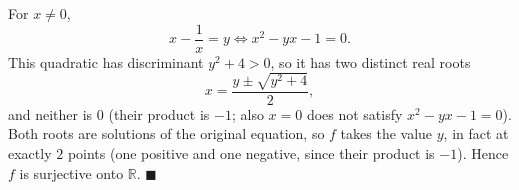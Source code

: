 For $x\ne0$,
\[x-\dfrac{1}{x}=y\iff x^2-yx-1=0 .\]
This quadratic has discriminant $y^2+4>0$, so it has two distinct real roots
\[x=\dfrac{y\pm\sqrt{y^2+4}}{2},\]
and neither is $0$ (their product is $-1$; also $x=0$ does not satisfy $x^2-yx-1=0$). Both roots are solutions of the original equation, so $f$ takes the value $y$, in fact at exactly $\boxed{2}$ points (one positive and one negative, since their product is $-1$). Hence $f$ is surjective onto $\mathbb R$. $\blacksquare$
